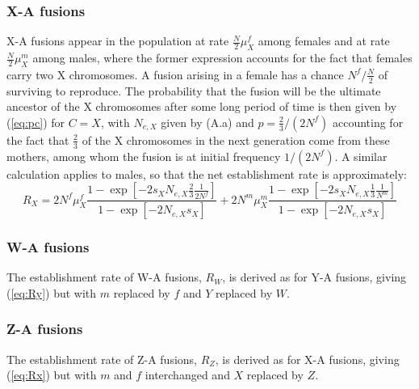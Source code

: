 \documentclass[12pt,twoside]{article}
\begin{document}
\subsubsection{X-A fusions}

X-A fusions appear in the population at rate $\frac{N}{\text{2}}\mu^f_X$ among females and at rate $\frac{N}{\text{2}}\mu^m_X$ among males, where the former expression accounts for the fact that females carry two X chromosomes. A fusion arising in a female has a chance $N^f/\frac{N}{\text{2}}$ of surviving to reproduce. The probability that the fusion will be the ultimate ancestor of the X chromosomes after some long period of time is then given by (\ref{eq:pc}) for $C = X$, with $N_{e,X}$ given by (A.a) and $p=\frac{\text{2}}{\text{3}}/(\text{2}N^f)$ accounting for the fact that $\frac{\text{2}}{\text{3}}$ of the X chromosomes in the next generation come from these mothers, among whom the fusion is at initial frequency $\text{1}/(\text{2}N^f)$. A similar calculation applies to males, so that the net establishment rate is approximately:
\begin{equation}\label{eq:Rx}
R_X = \text{2}N^f\mu^f_X 
\frac{\text{1}- \exp[-\text{2}s_X N_{e,X}  \frac{\text{2}}{\text{3}} \frac{\text{1}}{\text{2}N^f} ]}{\text{1} - \exp[-\text{2}N_{e,X} s_X]} 
+ \text{2}N^m\mu^m_X \frac{\text{1}- \exp[-\text{2}s_X N_{e,X}  \frac{\text{1}}{\text{3}} \frac{\text{1}}{N^m}]}{\text{1} - \exp[-\text{2}N_{e,X} s_X]}
\end{equation}

\subsubsection{W-A fusions}
The establishment rate of W-A fusions, $R_W$, is derived as for Y-A fusions, giving (\ref{eq:Ry}) but with $m$ replaced by $f$ and $Y$ replaced by $W$.

\subsubsection{Z-A fusions}
The establishment rate of Z-A fusions, $R_Z$, is derived as for X-A fusions, giving (\ref{eq:Rx}) but with $m$ and $f$ interchanged and $X$ replaced by $Z$.
\end{document}
